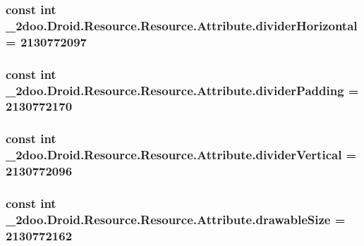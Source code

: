 \hypertarget{class__2doo_1_1_droid_1_1_resource_1_1_attribute_88b533056f8f1b106751c4480c4d43b1}{
\subsubsection[{dividerHorizontal}]{\setlength{\rightskip}{0pt plus 5cm}const int \_\-2doo.Droid.Resource.Resource.Attribute.dividerHorizontal = 2130772097}}
\label{class__2doo_1_1_droid_1_1_resource_1_1_attribute_88b533056f8f1b106751c4480c4d43b1}


\hypertarget{class__2doo_1_1_droid_1_1_resource_1_1_attribute_5b2233cae4dab86fa3aefb0ff0733532}{
\subsubsection[{dividerPadding}]{\setlength{\rightskip}{0pt plus 5cm}const int \_\-2doo.Droid.Resource.Resource.Attribute.dividerPadding = 2130772170}}
\label{class__2doo_1_1_droid_1_1_resource_1_1_attribute_5b2233cae4dab86fa3aefb0ff0733532}


\hypertarget{class__2doo_1_1_droid_1_1_resource_1_1_attribute_7d2a61bced05db5b7f6da5584d356812}{
\subsubsection[{dividerVertical}]{\setlength{\rightskip}{0pt plus 5cm}const int \_\-2doo.Droid.Resource.Resource.Attribute.dividerVertical = 2130772096}}
\label{class__2doo_1_1_droid_1_1_resource_1_1_attribute_7d2a61bced05db5b7f6da5584d356812}


\hypertarget{class__2doo_1_1_droid_1_1_resource_1_1_attribute_57e84b5f67972c137e0c12608aa24d8c}{
\subsubsection[{drawableSize}]{\setlength{\rightskip}{0pt plus 5cm}const int \_\-2doo.Droid.Resource.Resource.Attribute.drawableSize = 2130772162}}
\label{class__2doo_1_1_droid_1_1_resource_1_1_attribute_57e84b5f67972c137e0c12608aa24d8c}


